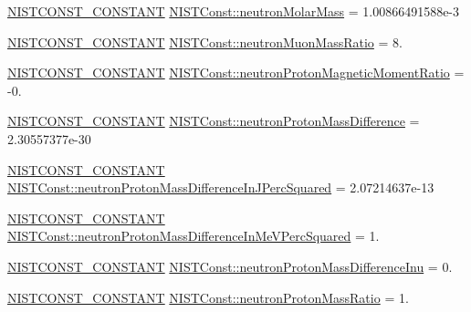 \begin{DoxyCompactItemize}
\item 
\mbox{\hyperlink{_n_i_s_t_const_8hpp_a2b0fc1d7452373f816175dd86ce26729}{N\+I\+S\+T\+C\+O\+N\+S\+T\+\_\+\+C\+O\+N\+S\+T\+A\+NT}} \mbox{\hyperlink{group___n_i_s_t_const-_neutron_ga0dab99bc4c4a4626a04a458989e3f548}{N\+I\+S\+T\+Const\+::neutron\+Molar\+Mass}} = 1.\+00866491588e-\/3
\item 
\mbox{\hyperlink{_n_i_s_t_const_8hpp_a2b0fc1d7452373f816175dd86ce26729}{N\+I\+S\+T\+C\+O\+N\+S\+T\+\_\+\+C\+O\+N\+S\+T\+A\+NT}} \mbox{\hyperlink{group___n_i_s_t_const-_neutron_gaeb6ef307f53654c093b5f0272c12cee8}{N\+I\+S\+T\+Const\+::neutron\+Muon\+Mass\+Ratio}} = 8.
\item 
\mbox{\hyperlink{_n_i_s_t_const_8hpp_a2b0fc1d7452373f816175dd86ce26729}{N\+I\+S\+T\+C\+O\+N\+S\+T\+\_\+\+C\+O\+N\+S\+T\+A\+NT}} \mbox{\hyperlink{group___n_i_s_t_const-_neutron_ga7c63abde504ba4e2dcfc17a92737f060}{N\+I\+S\+T\+Const\+::neutron\+Proton\+Magnetic\+Moment\+Ratio}} = -\/0.
\item 
\mbox{\hyperlink{_n_i_s_t_const_8hpp_a2b0fc1d7452373f816175dd86ce26729}{N\+I\+S\+T\+C\+O\+N\+S\+T\+\_\+\+C\+O\+N\+S\+T\+A\+NT}} \mbox{\hyperlink{group___n_i_s_t_const-_neutron_gaeb775581e4a0461cfb4d2401b297e862}{N\+I\+S\+T\+Const\+::neutron\+Proton\+Mass\+Difference}} = 2.\+30557377e-\/30
\item 
\mbox{\hyperlink{_n_i_s_t_const_8hpp_a2b0fc1d7452373f816175dd86ce26729}{N\+I\+S\+T\+C\+O\+N\+S\+T\+\_\+\+C\+O\+N\+S\+T\+A\+NT}} \mbox{\hyperlink{group___n_i_s_t_const-_neutron_gad9c0887872f150ac292cd709ed16f61e}{N\+I\+S\+T\+Const\+::neutron\+Proton\+Mass\+Difference\+In\+J\+Perc\+Squared}} = 2.\+07214637e-\/13
\item 
\mbox{\hyperlink{_n_i_s_t_const_8hpp_a2b0fc1d7452373f816175dd86ce26729}{N\+I\+S\+T\+C\+O\+N\+S\+T\+\_\+\+C\+O\+N\+S\+T\+A\+NT}} \mbox{\hyperlink{group___n_i_s_t_const-_neutron_ga9a359902a1534f52c59d549c3165edb8}{N\+I\+S\+T\+Const\+::neutron\+Proton\+Mass\+Difference\+In\+Me\+V\+Perc\+Squared}} = 1.
\item 
\mbox{\hyperlink{_n_i_s_t_const_8hpp_a2b0fc1d7452373f816175dd86ce26729}{N\+I\+S\+T\+C\+O\+N\+S\+T\+\_\+\+C\+O\+N\+S\+T\+A\+NT}} \mbox{\hyperlink{group___n_i_s_t_const-_neutron_gac808a9994102899511fafae56e842376}{N\+I\+S\+T\+Const\+::neutron\+Proton\+Mass\+Difference\+Inu}} = 0.
\item 
\mbox{\hyperlink{_n_i_s_t_const_8hpp_a2b0fc1d7452373f816175dd86ce26729}{N\+I\+S\+T\+C\+O\+N\+S\+T\+\_\+\+C\+O\+N\+S\+T\+A\+NT}} \mbox{\hyperlink{group___n_i_s_t_const-_neutron_gaac7e4945038ee4c7ad0f4642b58d4c95}{N\+I\+S\+T\+Const\+::neutron\+Proton\+Mass\+Ratio}} = 1.

\end{DoxyCompactItemize}
